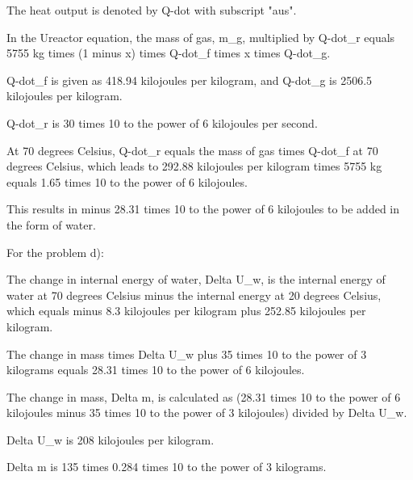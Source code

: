 The heat output is denoted by Q-dot with subscript "aus".

In the Ureactor equation, the mass of gas, m_g, multiplied by Q-dot_r equals 5755 kg times (1 minus x) times Q-dot_f times x times Q-dot_g.

Q-dot_f is given as 418.94 kilojoules per kilogram, and Q-dot_g is 2506.5 kilojoules per kilogram.

Q-dot_r is 30 times 10 to the power of 6 kilojoules per second.

At 70 degrees Celsius, Q-dot_r equals the mass of gas times Q-dot_f at 70 degrees Celsius, which leads to 292.88 kilojoules per kilogram times 5755 kg equals 1.65 times 10 to the power of 6 kilojoules.

This results in minus 28.31 times 10 to the power of 6 kilojoules to be added in the form of water.

For the problem d):

The change in internal energy of water, Delta U_w, is the internal energy of water at 70 degrees Celsius minus the internal energy at 20 degrees Celsius, which equals minus 8.3 kilojoules per kilogram plus 252.85 kilojoules per kilogram.

The change in mass times Delta U_w plus 35 times 10 to the power of 3 kilograms equals 28.31 times 10 to the power of 6 kilojoules.

The change in mass, Delta m, is calculated as (28.31 times 10 to the power of 6 kilojoules minus 35 times 10 to the power of 3 kilojoules) divided by Delta U_w.

Delta U_w is 208 kilojoules per kilogram.

Delta m is 135 times 0.284 times 10 to the power of 3 kilograms.